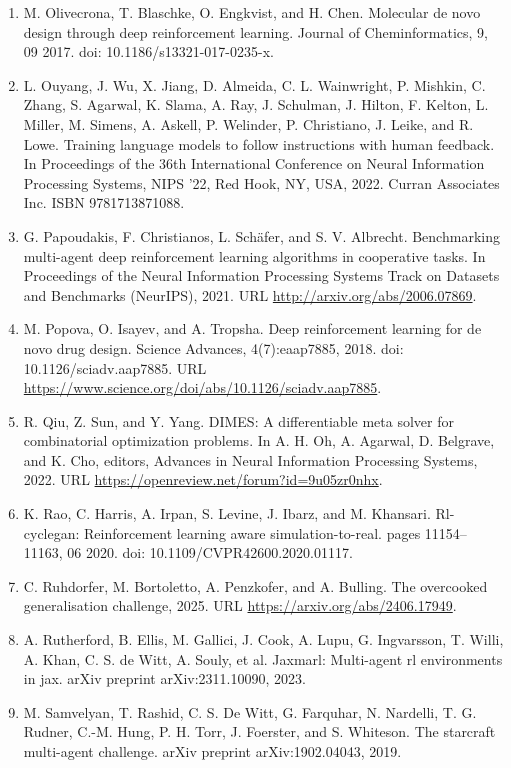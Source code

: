 \documentclass[11pt,UTF8,fontset=fandol]{ctexart}
\begin{document}
\begin{enumerate}[leftmargin=2em,itemsep=2pt]
\item M. Olivecrona, T. Blaschke, O. Engkvist, and H. Chen. Molecular de novo design through deep reinforcement learning. Journal of Cheminformatics, 9, 09 2017. doi: 10.1186/s13321-017-0235-x.
\item L. Ouyang, J. Wu, X. Jiang, D. Almeida, C. L. Wainwright, P. Mishkin, C. Zhang, S. Agarwal, K. Slama, A. Ray, J. Schulman, J. Hilton, F. Kelton, L. Miller, M. Simens, A. Askell, P. Welinder, P. Christiano, J. Leike, and R. Lowe. Training language models to follow instructions with human feedback. In Proceedings of the 36th International Conference on Neural Information Processing Systems, NIPS '22, Red Hook, NY, USA, 2022. Curran Associates Inc. ISBN 9781713871088.
\item G. Papoudakis, F. Christianos, L. Sch\"afer, and S. V. Albrecht. Benchmarking multi-agent deep reinforcement learning algorithms in cooperative tasks. In Proceedings of the Neural Information Processing Systems Track on Datasets and Benchmarks (NeurIPS), 2021. URL \url{http://arxiv.org/abs/2006.07869}.
\item M. Popova, O. Isayev, and A. Tropsha. Deep reinforcement learning for de novo drug design. Science Advances, 4(7):eaap7885, 2018. doi: 10.1126/sciadv.aap7885. URL \url{https://www.science.org/doi/abs/10.1126/sciadv.aap7885}.
\item R. Qiu, Z. Sun, and Y. Yang. DIMES: A differentiable meta solver for combinatorial optimization problems. In A. H. Oh, A. Agarwal, D. Belgrave, and K. Cho, editors, Advances in Neural Information Processing Systems, 2022. URL \url{https://openreview.net/forum?id=9u05zr0nhx}.
\item K. Rao, C. Harris, A. Irpan, S. Levine, J. Ibarz, and M. Khansari. Rl-cyclegan: Reinforcement learning aware simulation-to-real. pages 11154--11163, 06 2020. doi: 10.1109/CVPR42600.2020.01117.
\item C. Ruhdorfer, M. Bortoletto, A. Penzkofer, and A. Bulling. The overcooked generalisation challenge, 2025. URL \url{https://arxiv.org/abs/2406.17949}.
\item A. Rutherford, B. Ellis, M. Gallici, J. Cook, A. Lupu, G. Ingvarsson, T. Willi, A. Khan, C. S. de Witt, A. Souly, et al. Jaxmarl: Multi-agent rl environments in jax. arXiv preprint arXiv:2311.10090, 2023.
\item M. Samvelyan, T. Rashid, C. S. De Witt, G. Farquhar, N. Nardelli, T. G. Rudner, C.-M. Hung, P. H. Torr, J. Foerster, and S. Whiteson. The starcraft multi-agent challenge. arXiv preprint arXiv:1902.04043, 2019.

\end{enumerate}
\end{document}
